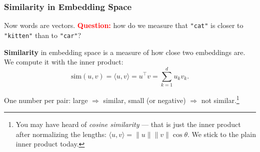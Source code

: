 
\begin{frame}
    \frametitle{Similarity in Embedding Space}

    Now words are vectors. \textcolor{red}{\textbf{Question:}} how do we measure that \texttt{"cat"} is closer to \texttt{"kitten"} than to \texttt{"car"}?

    \pause

    \begin{definition}[Similarity]
        \textbf{Similarity} in embedding space is a measure of how close two embeddings are. We compute it with the \alert{inner product}:
        \[
            \mathrm{sim}(u, v) = \langle u, v \rangle = u^\top v = \sum_{k=1}^{d} u_k v_k .
        \]
    \end{definition}

    \pause

    One number per pair: \alert{large} $\Rightarrow$ similar, \alert{small (or negative)} $\Rightarrow$ not similar.\footnote{You may have heard of \emph{cosine similarity} --- that is just the inner product after normalizing the lengths: $\langle u, v\rangle = \|u\|\|v\|\cos\theta$. We stick to the plain inner product today.}
\end{frame}

